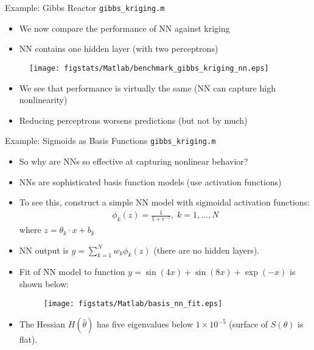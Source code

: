 \documentclass[handout,9pt]{beamer}
\begin{document}
\begin{frame}{Example: Gibbs Reactor \footnotesize{\texttt{gibbs\_kriging.m}}}

\begin{itemize}
   \setlength{\itemsep}{5pt}
\item We now compare the performance of NN against kriging
\item NN contains one hidden layer (with two perceptrons) 
\end{itemize}


\begin{figure}[!htb]
    \centering
	\texttt{[image: figstats/Matlab/benchmark\_gibbs\_kriging\_nn.eps]}
\end{figure}

\begin{itemize}
   \setlength{\itemsep}{5pt}
\item We see that performance is virtually the same (NN can capture high nonlinearity)
\item Reducing perceptrons worsens predictions (but not by much)
\end{itemize}

\end{frame}

\begin{frame}{Example: Sigmoids as Basis Functions \footnotesize{\texttt{gibbs\_kriging.m}}}

\begin{itemize}
\item So why are NNs so effective at capturing nonlinear behavior? 
\item NNs are sophisticated basis function models (use activation functions)
\item To see this, construct a simple NN model with sigmoidal activation functions:
\begin{align*}
\phi_k(z)=\frac{1}{1+e^{-z}},\; k=1,...,N
\end{align*}
where $z=\theta_k\cdot x + b_k$ 
\item NN output is $y=\sum_{k=1}^Nw_k\phi_k(z)$ (there are no hidden layers).  
\item Fit of NN model to function $y=\sin(4x)+\sin(8x)+\exp(-x)$ is shown below:

\begin{figure}[!htb]
    \centering
	\texttt{[image: figstats/Matlab/basis\_nn\_fit.eps]}
\end{figure}

\item The Hessian $H(\hat{\theta})$ has five eigenvalues below $1\times 10^{-5}$ (surface of $S(\theta)$ is flat). 
\end{itemize}

\end{frame}
\end{document}

